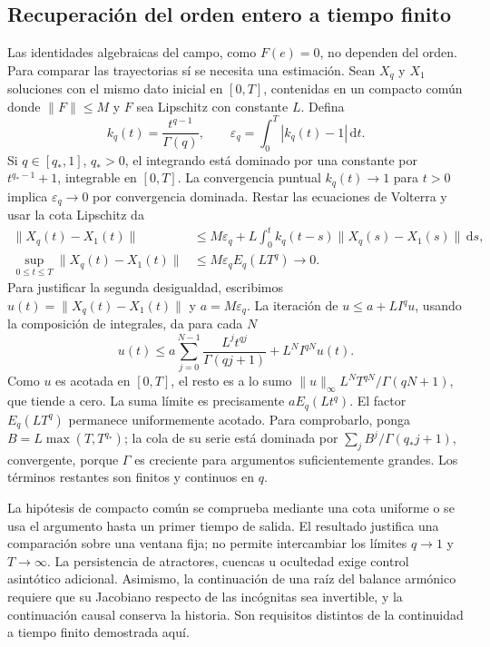 \subsection{Recuperación del orden entero a tiempo finito}
\label{sec:limite-entero-tiempo-finito}

Las identidades algebraicas del campo, como $F(e)=0$, no dependen del
orden. Para comparar las trayectorias sí se necesita una estimación.
Sean $X_q$ y $X_1$ soluciones con el mismo dato inicial en $[0,T]$,
contenidas en un compacto común donde $\|F\|\le M$ y $F$ sea Lipschitz
con constante $L$. Defina
\[
 k_q(t)=\frac{t^{q-1}}{\Gamma(q)},\qquad
 \varepsilon_q=\int_0^T|k_q(t)-1|\,\mathrm dt.
\]
Si $q\in[q_*,1]$, $q_*>0$, el integrando está dominado por una constante
por $t^{q_*-1}+1$, integrable en $[0,T]$. La convergencia puntual
$k_q(t)\to1$ para $t>0$ implica $\varepsilon_q\to0$ por convergencia
dominada. Restar las ecuaciones de Volterra y usar la cota Lipschitz da
\begin{align*}
 \|X_q(t)-X_1(t)\|
 &\le M\varepsilon_q+
 L\int_0^t k_q(t-s)\|X_q(s)-X_1(s)\|\,\mathrm ds,\\
 \sup_{0\le t\le T}\|X_q(t)-X_1(t)\|
 &\le M\varepsilon_q E_q(LT^q)\longrightarrow0.
\end{align*}
Para justificar la segunda desigualdad, escribimos
\(u(t)=\|X_q(t)-X_1(t)\|\) y \(a=M\varepsilon_q\). La iteración de
\(u\le a+LI^qu\), usando la composición de integrales, da para cada \(N\)
\[
 u(t)\le a\sum_{j=0}^{N-1}\frac{L^jt^{qj}}{\Gamma(qj+1)}
       +L^NI^{qN}u(t).
\]
Como \(u\) es acotada en \([0,T]\), el resto es a lo sumo
\(\|u\|_\infty L^NT^{qN}/\Gamma(qN+1)\), que tiende a cero.
La suma límite es precisamente \(aE_q(Lt^q)\).
El factor $E_q(LT^q)$ permanece uniformemente acotado. Para comprobarlo,
ponga $B=L\max(T,T^{q_*})$; la cola de su serie está dominada por
$\sum_j B^j/\Gamma(q_*j+1)$, convergente, porque $\Gamma$ es creciente
para argumentos suficientemente grandes. Los términos restantes son
finitos y continuos en $q$.

La hipótesis de compacto común se comprueba mediante una cota uniforme o
se usa el argumento hasta un primer tiempo de salida. El resultado
justifica una comparación sobre una ventana fija; no permite intercambiar
los límites $q\to1$ y $T\to\infty$. La persistencia de atractores,
cuencas u ocultedad exige control asintótico adicional. Asimismo, la
continuación de una raíz del balance armónico requiere que su Jacobiano
respecto de las incógnitas sea invertible, y la continuación causal
conserva la historia. Son requisitos distintos de la continuidad a
tiempo finito demostrada aquí.
\fi

